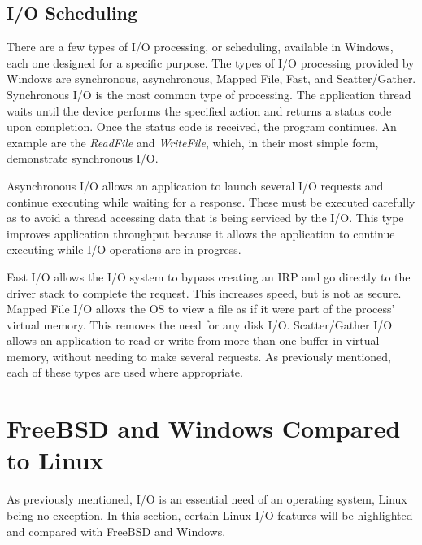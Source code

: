 \documentclass[10pt, onecolumn]{IEEEtran}
\begin{document}
        \subsection{I/O Scheduling}
            There are a few types of I/O processing, or scheduling, available in Windows, each one designed for a specific purpose. The types of I/O processing provided by Windows are synchronous, asynchronous, Mapped File, Fast, and Scatter/Gather. Synchronous I/O is the most common type of processing. The application thread waits until the device performs the specified action and returns a status code upon completion. Once the status code is received, the program continues. An example are the \textit{ReadFile} and \textit{WriteFile}, which, in their most simple form, demonstrate synchronous I/O.
            
            \vspace{1.5mm}
            
            Asynchronous I/O allows an application to launch several I/O requests and continue executing while waiting for a response. These must be executed carefully as to avoid a thread accessing data that is being serviced by the I/O. This type improves application throughput because it allows the application to continue executing while I/O operations are in progress.
            
            \vspace{1.5mm}
            
            
            Fast I/O allows the I/O system to bypass creating an IRP and go directly to the driver stack to complete the request. This increases speed, but is not as secure. Mapped File I/O allows the OS to view a file as if it were part of the process' virtual memory. This removes the need for any disk I/O. Scatter/Gather I/O allows an application to read or write from more than one buffer in virtual memory, without needing to make several requests. As previously mentioned, each of these types are used where appropriate.
    
    
    \section{FreeBSD and Windows Compared to Linux}
        As previously mentioned, I/O is an essential need of an operating system, Linux being no exception. In this section, certain Linux I/O features will be highlighted and compared with FreeBSD and Windows.
        
        \vspace{1.5mm}
        
\end{document}
